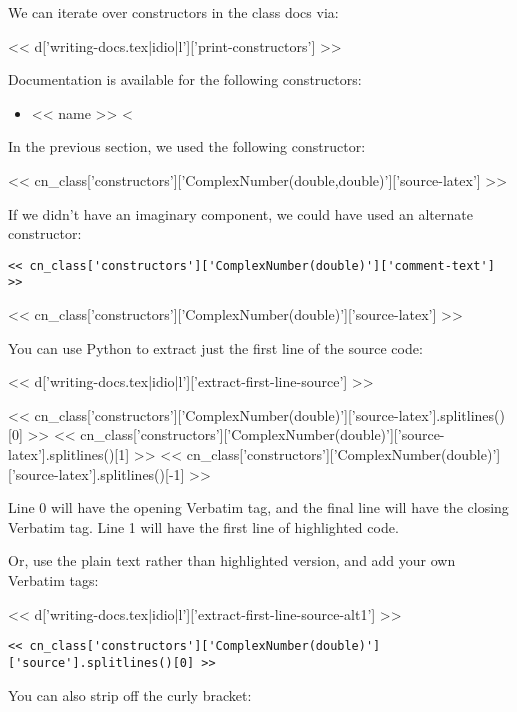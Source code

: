 We can iterate over constructors in the class docs via:

<< d['writing-docs.tex|idio|l']['print-constructors'] >>

Documentation is available for the following constructors:

\begin{itemize}
<%
\item{<< name >>}
<%
\end{itemize}

In the previous section, we used the following constructor:

<< cn_class['constructors']['ComplexNumber(double,double)']['source-latex'] >>

If we didn't have an imaginary component, we could have used an alternate constructor:

\begin{Verbatim}
<< cn_class['constructors']['ComplexNumber(double)']['comment-text'] >>
\end{Verbatim}
<< cn_class['constructors']['ComplexNumber(double)']['source-latex'] >>

You can use Python to extract just the first line of the source code:

<< d['writing-docs.tex|idio|l']['extract-first-line-source'] >>

<< cn_class['constructors']['ComplexNumber(double)']['source-latex'].splitlines()[0] >>
<< cn_class['constructors']['ComplexNumber(double)']['source-latex'].splitlines()[1] >>
<< cn_class['constructors']['ComplexNumber(double)']['source-latex'].splitlines()[-1] >>

Line 0 will have the opening Verbatim tag, and the final line will have the closing Verbatim tag. Line 1 will have the first line of highlighted code.

Or, use the plain text rather than highlighted version, and add your own Verbatim tags:

<< d['writing-docs.tex|idio|l']['extract-first-line-source-alt1'] >>

\begin{Verbatim}
<< cn_class['constructors']['ComplexNumber(double)']['source'].splitlines()[0] >>
\end{Verbatim}

You can also strip off the curly bracket:


